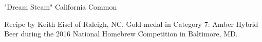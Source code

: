 \stylesection{\stylecaliforniacommon}

\begin{recipe}{"Dream Steam" California Common} %

\begin{aboutblock}
Recipe by Keith Eisel of Raleigh, NC. Gold medal in Category 7: Amber Hybrid Beer
during the 2016 National Homebrew Competition in Baltimore, MD. \sourceaha
\end{aboutblock}


\begin{methodandtiming}

\begin{mashsteps}
\end{mashsteps}

\begin{fermentationsteps}
\end{fermentationsteps}

\end{methodandtiming}

\recipebreak

\begin{ingredientsblock}

\begin{malts}
\end{malts}

\begin{hops}
\end{hops}


\end{ingredientsblock}

\end{recipe}

